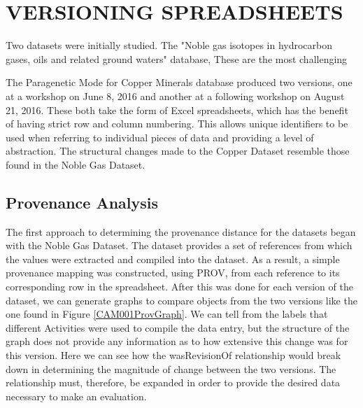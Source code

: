 
\chapter{VERSIONING SPREADSHEETS}\label{ch:spreadsheet}

Two datasets were initially studied.  The "Noble gas isotopes in hydrocarbon gases, oils and related ground waters" database,   These are the most challenging 

The Paragenetic Mode for Copper Minerals database produced two versions, one at a workshop on June 8, 2016 and another at a following workshop on August 21, 2016.  These both take the form of Excel spreadsheets, which has the benefit of having strict row and column numbering. This allows unique identifiers to be used when referring to individual pieces of data and providing a level of abstraction.  The structural changes made to the Copper Dataset resemble those found in the Noble Gas Dataset.

\section{Provenance Analysis}

The first approach to determining the provenance distance for the datasets began with the Noble Gas Dataset.  The dataset provides a set of references from which the values were extracted and compiled into the dataset.  As a result, a simple provenance mapping was constructed, using PROV, from each reference to its corresponding row in the spreadsheet.  After this was done for each version of the dataset, we can generate graphs to compare objects from the two versions like the one found in Figure \ref{CAM001ProvGraph}.  We can tell from the labels that different Activities were used to compile the data entry, but the structure of the graph does not provide any information as to how extensive this change was for this version.  Here we can see how the wasRevisionOf relationship would break down in determining the magnitude of change between the two versions.  The relationship must, therefore, be expanded in order to provide the desired data necessary to make an evaluation.

